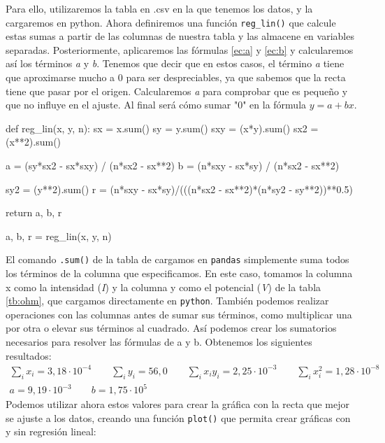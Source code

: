 \documentclass[12pt, a4paper, titlepage]{article}
\newcommand{\code}[1]{\texttt{#1}} %
\begin{document}
  Para ello, utilizaremos la tabla en .csv en la que tenemos los datos, y la cargaremos en python. Ahora definiremos una función \code{reg\_lin()} que calcule estas sumas a partir de las columnas de nuestra tabla y las almacene en variables separadas. Posteriormente, aplicaremos las fórmulas \ref{ec:a} y \ref{ec:b} y calcularemos así los términos \textit{a} y \textit{b}. Tenemos que decir que en estos casos, el término \textit{a} tiene que aproximarse mucho a 0 para ser despreciables, ya que sabemos que la recta tiene que pasar por el origen. Calcularemos \textit{a} para comprobar que es pequeño y que no influye en el ajuste. Al final será cómo sumar "0" en la fórmula $y = a + bx$.

  \begin{python}
    def reg_lin(x, y, n):
        sx = x.sum()
        sy = y.sum()
        sxy = (x*y).sum()
        sx2 = (x**2).sum()

        a = (sy*sx2 - sx*sxy) / (n*sx2 - sx**2)
        b = (n*sxy - sx*sy) / (n*sx2 - sx**2)

        sy2 = (y**2).sum()
        r = (n*sxy - sx*sy)/(((n*sx2 - sx**2)*(n*sy2 - sy**2))**0.5)

        return a, b, r

    a, b, r = reg_lin(x, y, n)
  \end{python}

  El comando \code{.sum()} de la tabla de cargamos en \code{pandas} simplemente suma todos los términos de la columna que especificamos. En este caso, tomamos la columna x como la intensidad (\textit{I}) y la columna y como el potencial (\textit{V}) de la tabla \ref{tb:ohm}, que cargamos directamente en \code{python}. También podemos realizar operaciones con las columnas antes de sumar sus términos, como multiplicar una por otra o elevar sus términos al cuadrado. Así podemos crear los sumatorios necesarios para resolver las fórmulas de a y b. Obtenemos los siguientes resultados:
  \begin{gather}
    \sum_i x_i = 3,18\cdot10^{-4} \nonumber \qquad \sum_i y_i = 56,0 \nonumber \qquad \sum_i x_iy_i = 2,25\cdot10^{-3} \nonumber \qquad \sum_i x_i^2 = 1,28\cdot10^{-8} \nonumber \\
    a = 9,19\cdot10^{-3} \nonumber \qquad b = 1,75 \cdot 10^5 \label{v:ohm}
  \end{gather}
  Podemos utilizar ahora estos valores para crear la gráfica con la recta que mejor se ajuste a los datos, creando una función \code{plot()} que permita crear gráficas con y sin regresión lineal:
\end{document}
